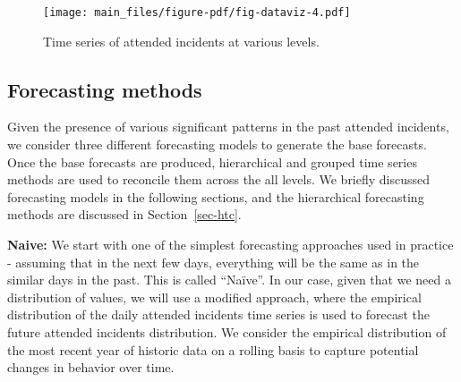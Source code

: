 \documentclass[
  authoryear,
  preprint,
  3p]{elsarticle}
\begin{document}
\begin{figure}
\begin{minipage}[t]{0.49\linewidth}
{{\texttt{[image: main\_files/figure-pdf/fig-dataviz-4.pdf]}

}

}

\end{minipage}%
\newline
\begin{minipage}[t]{\linewidth}

{\centering 


}

\end{minipage}%

\caption{\label{fig-dataviz}Time series of attended incidents at various
levels.}

\end{figure}

\hypertarget{forecasting-methods}{%
\subsection{Forecasting methods}\label{forecasting-methods}}

Given the presence of various significant patterns in the past attended
incidents, we consider three different forecasting models to generate
the base forecasts. Once the base forecasts are produced, hierarchical
and grouped time series methods are used to reconcile them across the
all levels. We briefly discussed forecasting models in the following
sections, and the hierarchical forecasting methods are discussed in
Section~\ref{sec-htc}.

\textbf{Naive:} We start with one of the simplest forecasting approaches
used in practice - assuming that in the next few days, everything will
be the same as in the similar days in the past. This is called
``Naïve''. In our case, given that we need a distribution of values, we
will use a modified approach, where the empirical distribution of the
daily attended incidents time series is used to forecast the future
attended incidents distribution. We consider the empirical distribution
of the most recent year of historic data on a rolling basis to capture
potential changes in behavior over time.
\end{document}

